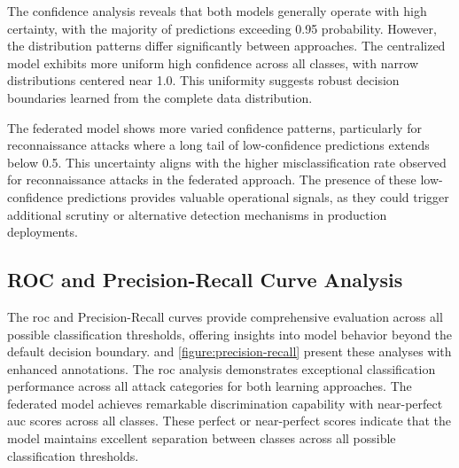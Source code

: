 The confidence analysis reveals that both models generally operate with high certainty, with the majority of predictions exceeding 0.95 probability. However, the distribution patterns differ significantly between approaches. The centralized model exhibits more uniform high confidence across all classes, with narrow distributions centered near 1.0. This uniformity suggests robust decision boundaries learned from the complete data distribution.

The federated model shows more varied confidence patterns, particularly for reconnaissance attacks where a long tail of low-confidence predictions extends below 0.5. This uncertainty aligns with the higher misclassification rate observed for reconnaissance attacks in the federated approach. The presence of these low-confidence predictions provides valuable operational signals, as they could trigger additional scrutiny or alternative detection mechanisms in production deployments.

\subsection{ROC and Precision-Recall Curve Analysis}

The \gls{roc} and Precision-Recall curves provide comprehensive evaluation across all possible classification thresholds, offering insights into model behavior beyond the default decision boundary.  and \ref{figure:precision-recall} present these analyses with enhanced annotations. The \gls{roc} analysis demonstrates exceptional classification performance across all attack categories for both learning approaches. The federated model achieves remarkable discrimination capability with near-perfect \gls{auc} scores across all classes. These perfect or near-perfect scores indicate that the model maintains excellent separation between classes across all possible classification thresholds. \\


